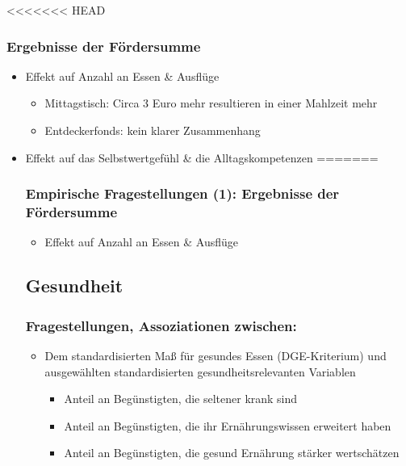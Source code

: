 <<<<<<< HEAD
\begin{frame}[fragile]
\frametitle{Ergebnisse der Fördersumme}

\begin{itemize}
\item Effekt auf Anzahl an Essen \& Ausflüge
\begin{itemize}
\item Mittagstisch: Circa 3 Euro mehr resultieren in einer Mahlzeit mehr
\item Entdeckerfonds: kein klarer Zusammenhang 
\end{itemize}
\item Effekt auf das Selbstwertgefühl \& die Alltagskompetenzen 
=======
\begin{frame}
\frametitle{Empirische Fragestellungen (1): Ergebnisse der Fördersumme}

\begin{itemize}
\item Effekt auf Anzahl an Essen & Ausflüge
\end{itemize}

\end{frame}

\subsection{Gesundheit}

\begin{frame}[fragile]
\frametitle{Fragestellungen, Assoziationen zwischen:}
\begin{itemize}
\item Dem standardisierten Maß für gesundes Essen (DGE-Kriterium) und ausgewählten standardisierten gesundheitsrelevanten Variablen
\begin{itemize}
\item Anteil an Begünstigten, die seltener krank sind
\item Anteil an Begünstigten, die ihr Ernährungswissen erweitert haben
\item Anteil an Begünstigten, die gesund Ernährung stärker wertschätzen
\end{itemize}
\end{itemize}
\end{frame}


\end{itemize}
\end{frame}

